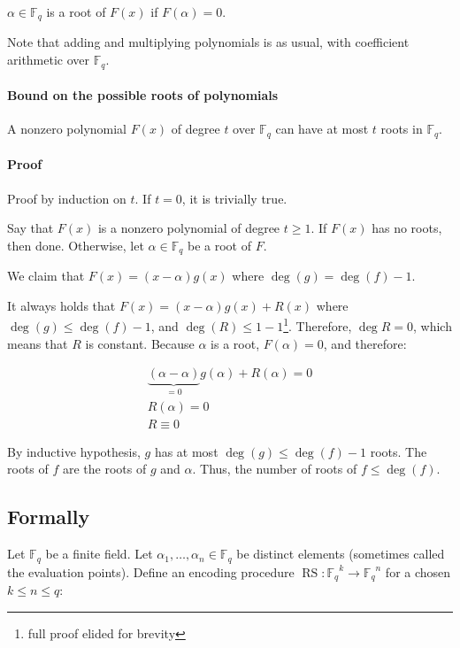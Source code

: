 \documentclass{idc_msc}
\newcommand{\Fq}[1][q]{{\mathbb{F}_{#1}}}
\DeclareMathOperator*{\RS}{RS}
\begin{document}
\(\alpha \in \Fq\) is a root of \(F(x)\) if \(F(\alpha) = 0\).

Note that adding and multiplying polynomials is as usual, with coefficient arithmetic over \(\Fq\).

\paragraph{Bound on the possible roots of polynomials}

A nonzero polynomial \(F(x)\) of degree \(t\) over \(\Fq\) can have at most \(t\) roots in \(\Fq\).

\paragraph{Proof}

Proof by induction on \(t\).
If \(t = 0\), it is trivially true.

Say that \(F(x)\) is a nonzero polynomial of degree \(t \ge 1\).
If \(F(x)\) has no roots, then done.
Otherwise, let \(\alpha \in \Fq\) be a root of \(F\).

We claim that \(F(x) = (x - \alpha)g(x)\) where \(\deg(g) = \deg(f) - 1\).

It always holds that \(F(x) = (x- \alpha)g(x) + R(x)\) where \(\deg(g) \le \deg(f) - 1\), and \(\deg(R) \le 1 - 1\)\footnote{full proof elided for brevity}.
Therefore, \(\deg{R} = 0\), which means that \(R\) is constant.
Because \(\alpha\) is a root, \(F(\alpha) = 0\), and therefore:

\[
\begin{aligned}
  \underbrace{(\alpha - \alpha)}_{=0}g(\alpha) + R(\alpha) = 0 \\
  R(\alpha) = 0 \\
  R \equiv 0
\end{aligned}
\]

By inductive hypothesis, \(g\) has at most \(\deg(g) \le \deg(f) - 1\) roots.
The roots of \(f\) are the roots of \(g\) and \(\alpha\).
Thus, the number of roots of \(f \le \deg(f)\).

\subsection{Formally}

Let \(\Fq\) be a finite field.
Let \(\alpha_1,\ldots,\alpha_n \in \Fq\) be distinct elements (sometimes called the evaluation points).
Define an encoding procedure \(\RS : \Fq^k \to \Fq^n\) for a chosen \(k \le n \le q\):
\end{document}
